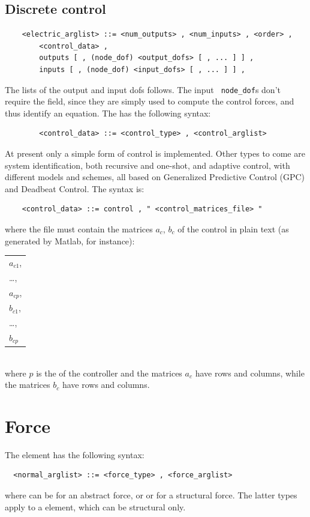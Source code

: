 \subsection{Discrete control}
  \begin{verbatim}
    <electric_arglist> ::= <num_outputs> , <num_inputs> , <order> ,
        <control_data> , 
        outputs [ , (node_dof) <output_dofs> [ , ... ] ] ,
        inputs [ , (node_dof) <input_dofs> [ , ... ] ] ,
  \end{verbatim}
  The lists of the output and input dofs follows. The input {\tt
  node\_dof}s don't require the  field, since they are simply
  used to compute the control forces, and thus identify an equation.
  The  has the following syntax:
  \begin{verbatim}  
        <control_data> ::= <control_type> , <control_arglist>
  \end{verbatim}
  At present only a simple form of control is implemented. Other types
  to come are system identification, both recursive and one-shot, and
  adaptive control, with different models and schemes, all based on 
  Generalized Predictive Control (GPC) and Deadbeat Control.
  The  syntax is:
  \begin{verbatim}
    <control_data> ::= control , " <control_matrices_file> "
  \end{verbatim}
  where the file  must contain the matrices
  $ a_c $, $ b_c $ of the control in plain text (as generated by Matlab, for
  instance): \\
  \begin{tabular}{l}
    $ a_{c1} $, \\
    \ldots,     \\
    $ a_{cp} $, \\
    $ b_{c1} $, \\
    \ldots,     \\
    $ b_{cp} $  \\
  \end{tabular} \\
  where $ p $ is the  of the controller and the matrices $ a_c $
  have  rows and  columns, while the
  matrices $ b_c $ have  rows and  columns.





\section{Force}\label{sec:FORCE}
The  element has the following syntax:
\begin{verbatim}
  <normal_arglist> ::= <force_type> , <force_arglist>
\end{verbatim}
where  can be  for an abstract force, or 
 or  for a structural force. The latter types
apply to a  element, which can be structural only.

